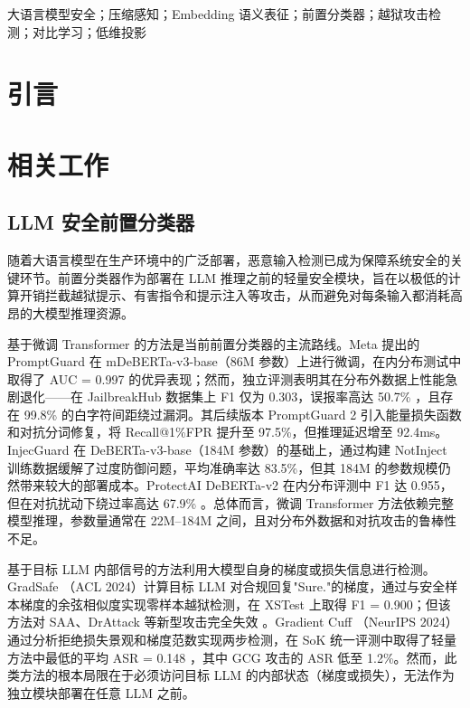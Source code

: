 \documentclass[conference]{IEEEtran}
\begin{document}
\begin{IEEEkeywords}
大语言模型安全；压缩感知；Embedding 语义表征；前置分类器；越狱攻击检测；对比学习；低维投影
\end{IEEEkeywords}

\section{引言}

\section{相关工作}

\subsection{LLM 安全前置分类器}

随着大语言模型在生产环境中的广泛部署，恶意输入检测已成为保障系统安全的关键环节。前置分类器作为部署在 LLM 推理之前的轻量安全模块，旨在以极低的计算开销拦截越狱提示、有害指令和提示注入等攻击，从而避免对每条输入都消耗高昂的大模型推理资源。

基于微调 Transformer 的方法是当前前置分类器的主流路线。Meta 提出的 PromptGuard \cite{b1} 在 mDeBERTa-v3-base（86M 参数）上进行微调，在内分布测试中取得了 AUC = 0.997 的优异表现；然而，独立评测表明其在分布外数据上性能急剧退化——在 JailbreakHub 数据集上 F1 仅为 0.303，误报率高达 50.7\% \cite{b2}，且存在 99.8\% 的白字符间距绕过漏洞。其后续版本 PromptGuard 2 \cite{b3} 引入能量损失函数和对抗分词修复，将 Recall@1\%FPR 提升至 97.5\%，但推理延迟增至 92.4ms。InjecGuard \cite{b4} 在 DeBERTa-v3-base（184M 参数）的基础上，通过构建 NotInject 训练数据缓解了过度防御问题，平均准确率达 83.5\%，但其 184M 的参数规模仍然带来较大的部署成本。ProtectAI DeBERTa-v2 在内分布评测中 F1 达 0.955，但在对抗扰动下绕过率高达 67.9\% \cite{b4}。总体而言，微调 Transformer 方法依赖完整模型推理，参数量通常在 22M--184M 之间，且对分布外数据和对抗攻击的鲁棒性不足。

基于目标 LLM 内部信号的方法利用大模型自身的梯度或损失信息进行检测。GradSafe \cite{b5}（ACL 2024）计算目标 LLM 对合规回复"Sure."的梯度，通过与安全样本梯度的余弦相似度实现零样本越狱检测，在 XSTest 上取得 F1 = 0.900；但该方法对 SAA、DrAttack 等新型攻击完全失效 \cite{b6}。Gradient Cuff \cite{b7}（NeurIPS 2024）通过分析拒绝损失景观和梯度范数实现两步检测，在 SoK 统一评测中取得了轻量方法中最低的平均 ASR = 0.148 \cite{b8}，其中 GCG 攻击的 ASR 低至 1.2\%。然而，此类方法的根本局限在于必须访问目标 LLM 的内部状态（梯度或损失），无法作为独立模块部署在任意 LLM 之前。
\end{document}
